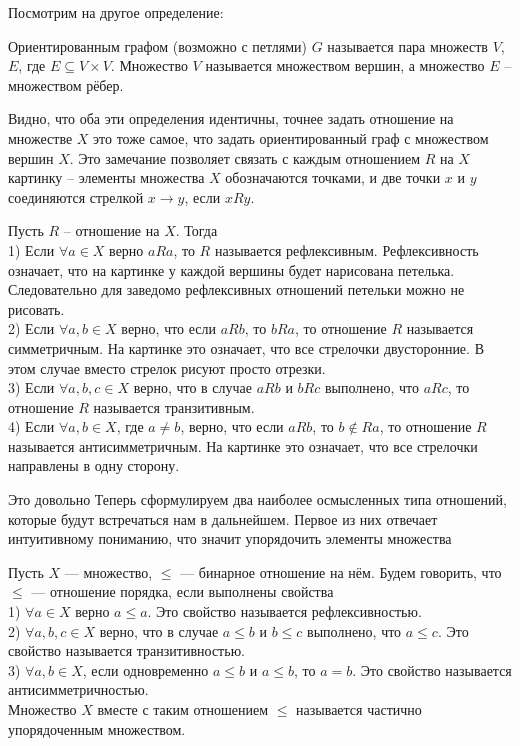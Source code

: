 Посмотрим на другое определение:

\dfn Ориентированным графом (возможно с петлями) $G$ называется пара множеств $V$, $E$, где $E \subseteq V \times V$. Множество $V$ называется множеством вершин, а множество $E$ -- множеством рёбер.
\edfn



Видно, что оба эти определения идентичны, точнее задать отношение на множестве $X$ это тоже самое, что задать ориентированный граф с множеством вершин $X$. Это замечание позволяет связать с каждым отношением $R$ на $X$ картинку -- элементы множества $X$ обозначаются точками, и две точки $x$ и $y$ соединяются стрелкой $x \to y$, если $x R y$.



\dfn Пусть  $R$ -- отношение на $X$. Тогда\\
1) Если $\forall a \in X$ верно $a R a$, то $R$ называется рефлексивным. Рефлексивность означает, что на картинке у каждой вершины будет нарисована петелька. Следовательно для заведомо рефлексивных отношений петельки можно не рисовать.\\
2) Если $\forall a,b \in X$ верно, что если $a R b$, то $b R a$, то отношение $R$ называется симметричным. На картинке это означает, что все стрелочки двусторонние. В этом случае вместо стрелок рисуют просто отрезки.\\
3) Если $\forall a,b,c \in X$ верно, что в случае $aR b $ и $b R c$ выполнено, что $a R c$, то отношение $R$ называется транзитивным.\\
4) Если $\forall a,b \in X$, где $a\neq b$, верно, что если $a R b$, то $b \notin R a$, то отношение $R$ называется антисимметричным. На картинке это означает, что все стрелочки направлены в одну сторону.\\
\edfn

Это довольно Теперь сформулируем два наиболее осмысленных типа отношений, которые будут встречаться нам в дальнейшем. Первое из них отвечает интуитивному пониманию, что значит упорядочить элементы множества



\dfn Пусть $X$ --- множество, $\leq$ --- бинарное отношение на нём. Будем говорить, что $\leq$ --- отношение порядка, если выполнены свойства\\
1)  $\forall a \in X$ верно $a \leq a$. Это свойство называется рефлексивностью.\\
2)  $\forall a,b,c \in X$ верно, что в случае $a \leq b $ и $b \leq c$ выполнено, что $a \leq c$. Это свойство называется транзитивностью.\\
3)  $\forall a,b \in X$, если одновременно $a\leq b$ и $a \leq b$, то $a=b$. Это свойство называется антисимметричностью.\\
Множество $X$ вместе с таким отношением $\leq$ называется частично упорядоченным множеством.
\edfn

